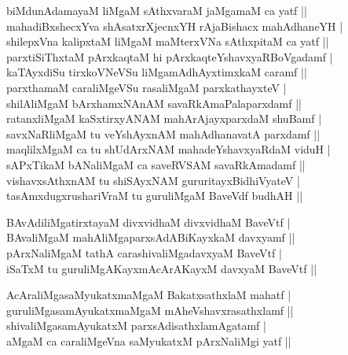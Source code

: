 \begin{entry}
\begin{shl}
biMdunAdamayaM liMgaM sAthxvaraM jaMgamaM ca yatf ||\\
mahadiBxshecxYva shAsatxrXjecnxYH rAjaBishacx mahAdhaneYH |\\
shilepxVna kalipxtaM liMgaM maMterxVNa sAthxpitaM ca yatf ||\\
parxtiSiThxtaM pArxkaqtaM hi pArxkaqteYshavxyaRBoVgadamf |\\
kaTAyxdiSu tirxkoVNeVSu liMgamAdhAyxtimxkaM caramf ||\\
parxthamaM caraliMgeVSu rasaliMgaM parxkathayxteV |\\
shilAliMgaM bArxhamxNAnAM savaRkAmaPalaparxdamf ||\\
ratanxliMgaM kaSxtirxyANAM mahArAjayxparxdaM shuBamf |\\
savxNaRliMgaM tu veYshAyxnAM mahAdhanavatA parxdamf ||\\
maqlilxMgaM ca tu shUdArxNAM mahadeYshavxyaRdaM viduH |\\
sAPxTikaM bANaliMgaM ca saveRVSAM savaRkAmadamf ||\\
vishavxsAthxnAM tu shiSAyxNAM gururitayxBidhiVyateV |\\
tasAmxdugxrushariVraM tu guruliMgaM BaveVdf budhAH ||
\end{shl}
\medskip
{}
\smallskip
\begin{shl}
BAvAdiliMgatirxtayaM divxvidhaM divxvidhaM BaveVtf |\\
BAvaliMgaM mahAliMgaparxsAdABiKayxkaM davxyamf ||\\
pArxNaliMgaM tathA carashivaliMgadavxyaM BaveVtf |\\
iSaTxM tu guruliMgAKayxmAcArAKayxM davxyaM BaveVtf ||
\end{shl}
\medskip
{}
\smallskip
\begin{shl}
AcAraliMgasaMyukatxmaMgaM BakatxsathxlaM mahatf |\\
guruliMgasamAyukatxmaMgaM mAheVshavxrasathxlamf ||\\
shivaliMgasamAyukatxM parxsAdisathxlamAgatamf |\\
aMgaM ca caraliMgeVna saMyukatxM pArxNaliMgi yatf ||\\

\end{shl}
\end{entry}
